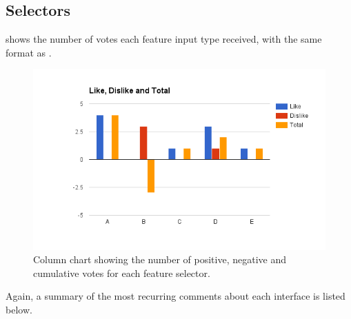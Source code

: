\documentclass{mproj}
\begin{document}
\subsection*{Selectors}

 shows the number of votes each feature input type received, with the same format as . 

\begin{figure}[h]
	\centering
	\includegraphics[width=\textwidth]{images/selector_feedback}
	\caption{Column chart showing the number of positive, negative and cumulative votes for each feature selector.}
	\label{fig:selector_feedback}
\end{figure}

Again, a summary of the most recurring comments about each interface is listed below.
\end{document}
